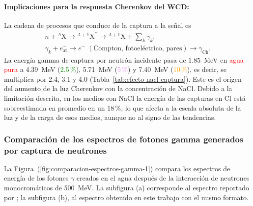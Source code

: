 \paragraph{Implicaciones para la respuesta Cherenkov del WCD:} La cadena de procesos que conduce de la captura a la señal es
\begin{gather}
	n + {}^{A}\mathrm{X} \longrightarrow {}^{A+1}\mathrm{X}^{*} \longrightarrow {}^{A+1}\mathrm{X} + \sum_{k}\gamma_{k}, \\
	\gamma_{k} + e^{-}_{\mathrm{at}} \longrightarrow e^{-} \;(\text{Compton, fotoeléctrico, pares}) \longrightarrow \gamma_{\mathrm{Ch}} .
\end{gather}
La energía gamma de captura por neutrón incidente pasa de 1.85~MeV en \textcolor{red}{agua pura} a 4.39~MeV (\textcolor{green}{2.5\,\%}), 5.71~MeV (\textcolor{violet}{5\,\%}) y 7.40~MeV (\textcolor{orange}{10\,\%}), es decir, se multiplica por 2.4, 3.1 y 4.0 (Tabla~\ref{tab:efecto-nacl-captura}). Este es el origen del aumento de la luz Cherenkov con la concentración de NaCl. Debido a la limitación descrita, en los medios con NaCl la energía de las capturas en Cl está sobreestimada en promedio en un 18\,\%, lo que afecta a la escala absoluta de la luz y de la carga de esos medios, aunque no al signo de las tendencias.

\subsubsection{Comparación de los espectros de fotones gamma generados por captura de neutrones}
\label{subsubsec:espectros-gamma}

\noindent La Figura~(\ref{fig:comparacion-espectros-gamma-1}) compara los espectros de energía de los fotones $\gamma$ creados en el agua después de la interacción de neutrones monocromáticos de 500~MeV. La subfigura (a) corresponde al espectro reportado por \citet[Fig.~3, pp.~2219--2220]{Sidelnik2020}; la subfigura (b), al espectro obtenido en este trabajo con el mismo formato.

